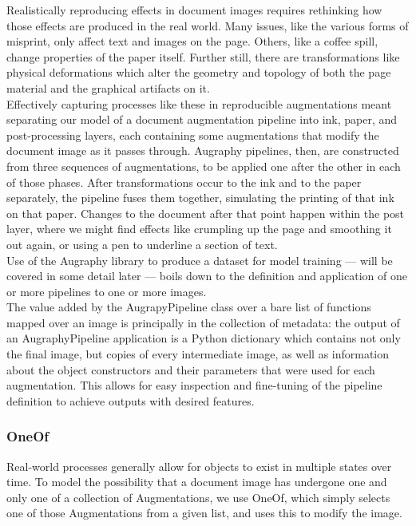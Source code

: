\documentclass[runningheads]{article}
\begin{document}
Realistically reproducing effects in document images requires rethinking how those effects are produced in the real world. Many issues, like the various forms of misprint, only affect text and images on the page. Others, like a coffee spill, change properties of the paper itself. Further still, there are transformations like physical deformations which alter the geometry and topology of both the page material and the graphical artifacts on it.\\

Effectively capturing processes like these in reproducible augmentations meant separating our model of a document augmentation pipeline into ink, paper, and post-processing layers, each containing some augmentations that modify the document image as it passes through. Augraphy pipelines, then, are constructed from three sequences of augmentations, to be applied one after the other in each of those phases. After transformations occur to the ink and to the paper separately, the pipeline fuses them together, simulating the printing of that ink on that paper. Changes to the document after that point happen within the post layer, where we might find effects like crumpling up the page and smoothing it out again, or using a pen to underline a section of text.\\

Use of the Augraphy library to produce a dataset for model training — will be covered in some detail later — boils down to the definition and application of one or more pipelines to one or more images.\\

The value added by the AugrapyPipeline class over a bare list of functions mapped over an image is principally in the collection of metadata: the output of an AugraphyPipeline application is a Python dictionary which contains not only the final image, but copies of every intermediate image, as well as information about the object constructors and their parameters that were used for each augmentation. This allows for easy inspection and fine-tuning of the pipeline definition to achieve outputs with desired features.

\subsubsection{OneOf}
\label{sec:orgb9ecb78}
Real-world processes generally allow for objects to exist in multiple states over time. To model the possibility that a document image has undergone one and only one of a collection of Augmentations, we use OneOf, which simply selects one of those Augmentations from a given list, and uses this to modify the image.
\end{document}
